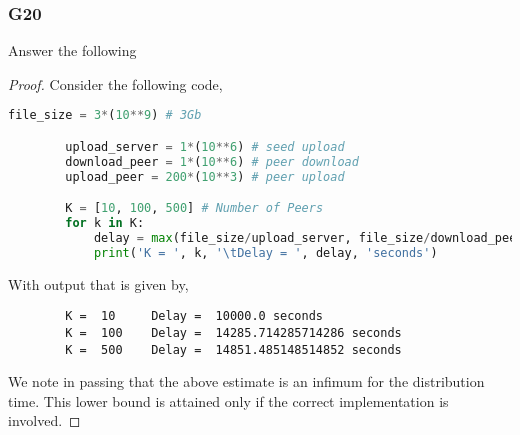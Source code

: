 \documentclass[../main.tex]{subfiles}
\begin{document}
\subsubsection*{G20}
\begin{wts}
    Answer the following\\
\end{wts}
\begin{proof}
Consider the following code,\\
    \begin{lstlisting}[language=Python]
        file_size = 3*(10**9) # 3Gb

        upload_server = 1*(10**6) # seed upload
        download_peer = 1*(10**6) # peer download
        upload_peer = 200*(10**3) # peer upload

        K = [10, 100, 500] # Number of Peers
        for k in K:
            delay = max(file_size/upload_server, file_size/download_peer, (k*file_size)/(upload_server + k*upload_peer))
            print('K = ', k, '\tDelay = ', delay, 'seconds')\end{lstlisting}
        With output that is given by,
        \begin{lstlisting}
        K =  10 	Delay =  10000.0 seconds
        K =  100 	Delay =  14285.714285714286 seconds
        K =  500 	Delay =  14851.485148514852 seconds\end{lstlisting}
        We note in passing that the above estimate is an infimum for the distribution time. This lower bound is attained only if the correct implementation is involved.

\end{proof}
\end{document}
